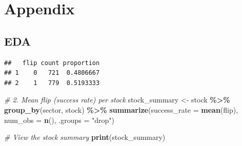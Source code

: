 \documentclass[
  11pt,
]{article}
\newenvironment{Shaded}{\begin{snugshade}}{\end{snugshade}}
\newcommand{\AttributeTok}[1]{\textcolor[rgb]{0.13,0.29,0.53}{#1}}
\newcommand{\CommentTok}[1]{\textcolor[rgb]{0.56,0.35,0.01}{\textit{#1}}}
\newcommand{\FunctionTok}[1]{\textcolor[rgb]{0.13,0.29,0.53}{\textbf{#1}}}
\newcommand{\NormalTok}[1]{#1}
\newcommand{\OtherTok}[1]{\textcolor[rgb]{0.56,0.35,0.01}{#1}}
\newcommand{\SpecialCharTok}[1]{\textcolor[rgb]{0.81,0.36,0.00}{\textbf{#1}}}
\newcommand{\StringTok}[1]{\textcolor[rgb]{0.31,0.60,0.02}{#1}}
\begin{document}
\section{Appendix}\label{appendix}

\subsection{EDA}\label{eda}

\begin{Shaded}
\end{Shaded}

\begin{verbatim}
##   flip count proportion
## 1    0   721  0.4806667
## 2    1   779  0.5193333
\end{verbatim}

\begin{Shaded}
\begin{Highlighting}[]
\CommentTok{\# 2. Mean flip (success rate) per stock}
\NormalTok{stock\_summary }\OtherTok{\textless{}{-}}\NormalTok{ stock }\SpecialCharTok{\%\textgreater{}\%}
  \FunctionTok{group\_by}\NormalTok{(sector, stock) }\SpecialCharTok{\%\textgreater{}\%}
  \FunctionTok{summarize}\NormalTok{(}\AttributeTok{success\_rate =} \FunctionTok{mean}\NormalTok{(flip),}
            \AttributeTok{num\_obs =} \FunctionTok{n}\NormalTok{(),}
            \AttributeTok{.groups =} \StringTok{"drop"}\NormalTok{)}

\CommentTok{\# View the stock summary}
\FunctionTok{print}\NormalTok{(stock\_summary)}
\end{Highlighting}
\end{Shaded}
\end{document}
